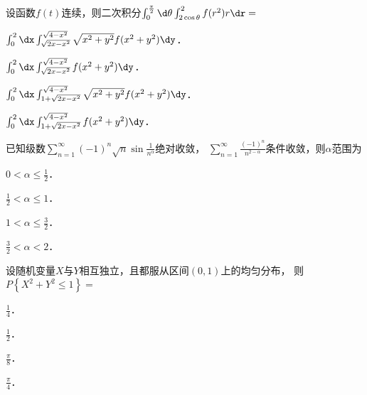 \documentclass[plain,noanswer,medmath]{../../template/jnuexam}
\begin{document}










\begin{problem}
设函数$f(t)$连续，则二次积分$\int_0^{\frac{\pi}{2}} \d\theta \int_{2\cos \theta}^2 f(r^2)r\dr =$\pickout{}
\begin{abcd}
\item $\int_0^2 \dx \int_{\sqrt{2x - x^2}}^{\sqrt{4 - x^2}} \sqrt{x^2 + y^2} f(x^2 + y^2)\dy$．
\item $\int_0^2 \dx \int_{\sqrt{2x - x^2}}^{\sqrt{4 - x^2}} f(x^2 + y^2)\dy$．
\item $\int_0^2 \dx \int_{1 + \sqrt{2x - x^2}}^{\sqrt{4 - x^2}} \sqrt{x^2 + y^2} f(x^2 + y^2)\dy$．
\item $\int_0^2 \dx \int_{1 + \sqrt{2x - x^2}}^{\sqrt{4 - x^2}} f(x^2 + y^2)\dy$．
\end{abcd}
\end{problem}


\begin{problem}
已知级数$\sum_{n = 1}^{\infty}(- 1)^n\sqrt{n} \sin \frac{1}{n^{\alpha}}$绝对收敛，
$\sum_{n = 1}^{\infty}\frac{(- 1)^n}{n^{2 - \alpha}}$条件收敛，则$\alpha$范围为\pickout{}
\begin{abcd}
\item $0 < \alpha \le \frac{1}{2}$．
\item $\frac{1}{2} < \alpha \le 1$．
\item $1 < \alpha \le \frac{3}{2}$．
\item $\frac{3}{2} < \alpha < 2$．
\end{abcd}
\end{problem}






\begin{problem}
设随机变量$X$与$Y$相互独立，且都服从区间$\left(0,1 \right)$上的均匀分布，\goodbreak
则$P\left\{X^2 + Y^2 \le 1 \right\} =$\pickout{}
\begin{abcd}
\item $\frac{1}{4}$．
\item $\frac{1}{2}$．
\item $\frac{\pi}{8}$．
\item $\frac{\pi}{4}$．
\end{abcd}
\end{problem}
\end{document}
